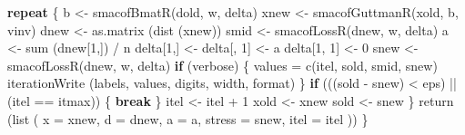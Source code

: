 \documentclass[
  12pt,
  letterpaper,
  DIV=11,
  numbers=noendperiod]{scrreprt}
\newenvironment{Shaded}{\begin{snugshade}}{\end{snugshade}}
\newcommand{\AttributeTok}[1]{\textcolor[rgb]{0.40,0.45,0.13}{#1}}
\newcommand{\ControlFlowTok}[1]{\textcolor[rgb]{0.00,0.23,0.31}{\textbf{#1}}}
\newcommand{\DecValTok}[1]{\textcolor[rgb]{0.68,0.00,0.00}{#1}}
\newcommand{\FunctionTok}[1]{\textcolor[rgb]{0.28,0.35,0.67}{#1}}
\newcommand{\NormalTok}[1]{\textcolor[rgb]{0.00,0.23,0.31}{#1}}
\newcommand{\OtherTok}[1]{\textcolor[rgb]{0.00,0.23,0.31}{#1}}
\newcommand{\SpecialCharTok}[1]{\textcolor[rgb]{0.37,0.37,0.37}{#1}}
\theoremstyle{remark}
\begin{document}
\begin{Shaded}
\begin{Highlighting}[]
    \ControlFlowTok{repeat}\NormalTok{ \{}
\NormalTok{      b }\OtherTok{\textless{}{-}} \FunctionTok{smacofBmatR}\NormalTok{(dold, w, delta)}
\NormalTok{      xnew }\OtherTok{\textless{}{-}} \FunctionTok{smacofGuttmanR}\NormalTok{(xold, b, vinv)}
\NormalTok{      dnew }\OtherTok{\textless{}{-}} \FunctionTok{as.matrix}\NormalTok{ (}\FunctionTok{dist}\NormalTok{ (xnew))}
\NormalTok{      smid }\OtherTok{\textless{}{-}} \FunctionTok{smacofLossR}\NormalTok{(dnew, w, delta)}
\NormalTok{      a }\OtherTok{\textless{}{-}} \FunctionTok{sum}\NormalTok{ (dnew[}\DecValTok{1}\NormalTok{,]) }\SpecialCharTok{/}\NormalTok{ n}
\NormalTok{      delta[}\DecValTok{1}\NormalTok{,] }\OtherTok{\textless{}{-}}\NormalTok{ delta[, }\DecValTok{1}\NormalTok{] }\OtherTok{\textless{}{-}}\NormalTok{ a}
\NormalTok{      delta[}\DecValTok{1}\NormalTok{, }\DecValTok{1}\NormalTok{] }\OtherTok{\textless{}{-}} \DecValTok{0}
\NormalTok{      snew }\OtherTok{\textless{}{-}} \FunctionTok{smacofLossR}\NormalTok{(dnew, w, delta)}
      \ControlFlowTok{if}\NormalTok{ (verbose) \{}
\NormalTok{        values }\OtherTok{=} \FunctionTok{c}\NormalTok{(itel, sold, smid, snew)}
        \FunctionTok{iterationWrite}\NormalTok{ (labels, values, digits, width, format)}
\NormalTok{      \}}
      \ControlFlowTok{if}\NormalTok{ (((sold }\SpecialCharTok{{-}}\NormalTok{ snew) }\SpecialCharTok{\textless{}}\NormalTok{ eps) }\SpecialCharTok{||}\NormalTok{ (itel }\SpecialCharTok{==}\NormalTok{ itmax)) \{}
        \ControlFlowTok{break}
\NormalTok{      \}}
\NormalTok{      itel }\OtherTok{\textless{}{-}}\NormalTok{ itel }\SpecialCharTok{+} \DecValTok{1}
\NormalTok{      xold }\OtherTok{\textless{}{-}}\NormalTok{ xnew}
\NormalTok{      sold }\OtherTok{\textless{}{-}}\NormalTok{ snew}
\NormalTok{    \}}
    \FunctionTok{return}\NormalTok{ (}\FunctionTok{list}\NormalTok{ (}
      \AttributeTok{x =}\NormalTok{ xnew,}
      \AttributeTok{d =}\NormalTok{ dnew,}
      \AttributeTok{a =}\NormalTok{ a,}
      \AttributeTok{stress =}\NormalTok{ snew,}
      \AttributeTok{itel =}\NormalTok{ itel}
\NormalTok{    ))}
\NormalTok{  \}}


\end{Highlighting}
\end{Shaded}
\end{document}

